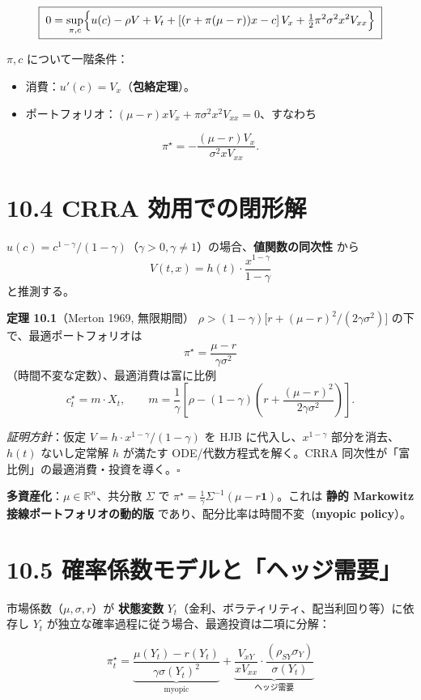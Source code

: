 \documentclass[11pt,a4paper]{report}
\begin{document}
\[ \boxed{\; 0 = \sup_{\pi, c}\Bigl\{ u(c) - \rho V + V_t + [(r + \pi(\mu - r)) x - c]\, V_x + \tfrac{1}{2} \pi^2 \sigma^2 x^2 V_{xx}\Bigr\} \;} \]

$\pi, c$ について一階条件：
\begin{itemize}
\item 消費：$u'(c) = V_x$（\textbf{包絡定理}）。
\item ポートフォリオ：$(\mu - r) x V_x + \pi \sigma^2 x^2 V_{xx} = 0$、すなわち
\end{itemize}
\[ \pi^\star = -\frac{(\mu - r) V_x}{\sigma^2 x V_{xx}}. \]

\section{10.4 CRRA 効用での閉形解}

$u(c) = c^{1-\gamma}/(1-\gamma)$（$\gamma > 0, \gamma \neq 1$）の場合、\textbf{値関数の同次性} から \[ V(t, x) = h(t) \cdot \frac{x^{1-\gamma}}{1-\gamma} \] と推測する。

\textbf{定理 10.1}（Merton 1969, 無限期間） $\rho > (1-\gamma)\bigl[r + (\mu-r)^2/(2\gamma\sigma^2)\bigr]$ の下で、最適ポートフォリオは \[ \boxed{\; \pi^\star = \frac{\mu - r}{\gamma \sigma^2} \;} \] （時間不変な定数）、最適消費は富に比例 \[ c^\star_t = m \cdot X_t,\qquad m = \frac{1}{\gamma}\left[\rho - (1-\gamma)\left(r + \frac{(\mu-r)^2}{2\gamma\sigma^2}\right)\right]. \]

\emph{証明方針}：仮定 $V = h \cdot x^{1-\gamma}/(1-\gamma)$ を HJB に代入し、$x^{1-\gamma}$ 部分を消去、$h(t)$ ないし定常解 $h$ が満たす ODE/代数方程式を解く。CRRA 同次性が「富比例」の最適消費・投資を導く。$\square$

\textbf{多資産化}：$\mu \in \mathbb{R}^n$、共分散 $\Sigma$ で $\pi^\star = \tfrac{1}{\gamma} \Sigma^{-1}(\mu - r\mathbf{1})$。これは \textbf{静的 Markowitz 接線ポートフォリオの動的版} であり、配分比率は時間不変（\textbf{myopic policy}）。

\section{10.5 確率係数モデルと「ヘッジ需要」}

市場係数（$\mu, \sigma, r$）が \textbf{状態変数} $Y_t$（金利、ボラティリティ、配当利回り等）に依存し $Y_t$ が独立な確率過程に従う場合、最適投資は二項に分解：

\[ \pi^\star_t = \underbrace{\frac{\mu(Y_t) - r(Y_t)}{\gamma \sigma(Y_t)^2}}_{\text{myopic}} + \underbrace{\frac{V_{xY}}{x V_{xx}} \cdot \frac{(\rho_{SY} \sigma_Y)}{\sigma(Y_t)}}_{\text{ヘッジ需要}} \]
\end{document}
